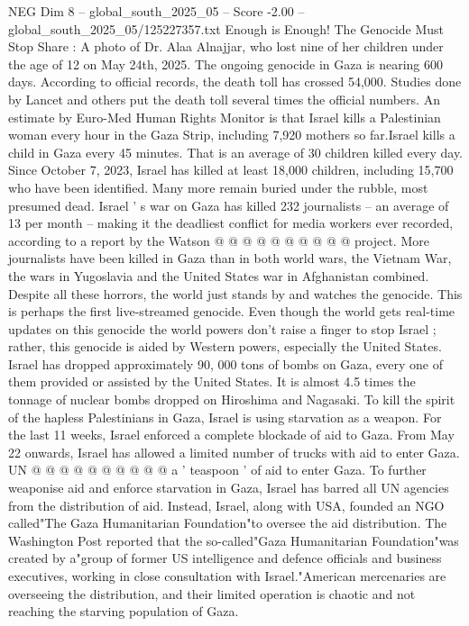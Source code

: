 \begin{textsample}{NEG Dim 8 – global\_south\_2025\_05 – Score -2.00 – global\_south\_2025\_05/125227357.txt}  \label{ex:f8_neg_005}
Enough is Enough!
The Genocide Must Stop Share : A photo of Dr.
Alaa Alnajjar, who lost nine of her children under the age of 12 on May 24th, 2025.
The ongoing genocide in Gaza is nearing 600 days.
According to official records, the death toll has crossed 54,000.
Studies done by Lancet and others put the death toll several times the official numbers.
An estimate by Euro-Med Human Rights Monitor is that Israel kills a Palestinian woman every hour in the Gaza Strip, including 7,920 mothers so far.Israel kills a child in Gaza every 45 minutes.
That is an average of 30 children killed every day.
Since October 7, 2023, Israel has killed at least 18,000 children, including 15,700 who have been identified.
Many more remain buried under the rubble, most presumed dead.
Israel ' s war on Gaza has killed 232 journalists -- an average of 13 per month -- making it the deadliest conflict for media workers ever recorded, according to a report by the Watson @ @ @ @ @ @ @ @ @ @ project.
More journalists have been killed in Gaza than in both world wars, the Vietnam War, the wars in Yugoslavia and the United States war in Afghanistan combined.
Despite all these horrors, the world just stands by and watches the genocide.
This is perhaps the first live-streamed genocide.
Even though the world gets real-time updates on this genocide the world powers don't raise a finger to stop Israel ; rather, this genocide is aided by Western powers, especially the United States.
Israel has dropped approximately 90, 000 tons of bombs on Gaza, every one of them provided or assisted by the United States.
It is almost 4.5 times the tonnage of nuclear bombs dropped on Hiroshima and Nagasaki.
To kill the spirit of the hapless Palestinians in Gaza, Israel is using starvation as a weapon.
For the last 11 weeks, Israel enforced a complete blockade of aid to Gaza.
From May 22 onwards, Israel has allowed a limited number of trucks with aid to enter Gaza.
UN @ @ @ @ @ @ @ @ @ @ a ' teaspoon ' of aid to enter Gaza.
To further weaponise aid and enforce starvation in Gaza, Israel has barred all UN agencies from the distribution of aid.
Instead, Israel, along with USA, founded an NGO called"The Gaza Humanitarian Foundation"to oversee the aid distribution.
The Washington Post reported that the so-called"Gaza Humanitarian Foundation"was created by a"group of former US intelligence and defence officials and business executives, working in close consultation with Israel."American mercenaries are overseeing the distribution, and their limited operation is chaotic and not reaching the starving population of Gaza.

\end{textsample}
